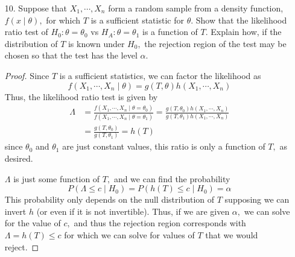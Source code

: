 \documentclass{article}
\begin{document}
\begin{itemize}
	\item[10.] Suppose that $X_1, \cdots, X_n$ form a random sample from a density function, $f(x\mid \theta),$ for which $T$ is a sufficient statistic for $\theta.$ Show that the likelihood ratio test of $H_0:\theta=\theta_0$ vs $H_A:\theta=\theta_1$ is a function of $T.$ Explain how, if the distribution of $T$ is known under $H_0,$ the rejection region of the test may be chosen so that the test has the level $\alpha.$
		\begin{proof}
			Since $T$ is a sufficient statistics, we can factor the likelihood as \[f(X_1, \cdots, X_n\mid \theta) = g(T, \theta) h(X_1, \cdots, X_n)\] Thus, the likelihood ratio test is given by
			\begin{align*}
				\Lambda &= \frac{f(X_1,\cdots, X_n\mid \theta=\theta_0)}{f(X_1, \cdots, X_n\mid \theta=\theta_1)} = \frac{g(T, \theta_0) h(X_1, \cdots, X_n)}{g(T, \theta_1) h(X_1, \cdots, X_n)} \\
				&= \frac{g(T, \theta_0)}{g(T, \theta_1)} = h(T)
			\end{align*}
			since $\theta_0$ and $\theta_1$ are just constant values, this ratio is only a function of $T,$ as desired.

			$\Lambda$ is just some function of $T,$ and we can find the probability \[P(\Lambda\le c\mid H_0) = P(h(T)\le c\mid H_0)=\alpha\] This probability only depends on the null distribution of $T$ supposing we can invert $h$ (or even if it is not invertible). Thus, if we are given $\alpha,$ we can solve for the value of $c,$ and thus the rejection region corresponds with $\Lambda=h(T)\le c$ for which we can solve for values of $T$ that we would reject.

		\end{proof}


\end{itemize}
\end{document}
